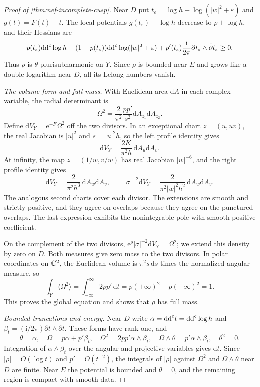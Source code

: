 \begin{proof}[Proof of \cref{thm:nef-incomplete-cusp}]
Near $D$ put $t_\varepsilon=\log h-\log(|w|^2+\varepsilon)$ and $g(t)=F(t)-t$. The local potentials $g(t_\varepsilon)+\log h$ decrease to $\rho+\log h$, and their Hessians are
\[
 p(t_\varepsilon)\mathrm{dd}^{\mathrm{c}}\log h
 +(1-p(t_\varepsilon))\mathrm{dd}^{\mathrm{c}}\log(|w|^2+\varepsilon)
 +p'(t_\varepsilon)\frac{\mathrm{i}}{2\pi}
       \partial t_\varepsilon\wedge\bar\partial t_\varepsilon\geq0.
\]
Thus $\rho$ is $\theta$-plurisubharmonic on $Y$. Since $\rho$ is bounded near $E$ and grows like a double logarithm near $D$, all its Lelong numbers vanish.

\emph{The volume form and full mass.}
With Euclidean area $\mathrm{d}A$ in each complex variable, the radial determinant is
\begin{equation}\label{eq:nef-cusp-radial-determinant}
 \Omega^2=\frac{2}{\pi^2}\frac{pp'}{s^2}
                  \mathrm{d}A_{z_1}\mathrm{d}A_{z_2}.
\end{equation}
Define $\mathrm{d}V_Y=\mathrm{e}^{-F}\Omega^2$ off the two divisors. In an exceptional chart $z=(u,uv)$, the real Jacobian is $|u|^2$ and $s=|u|^2h$, so the left profile identity gives
\[
 \mathrm{d}V_Y=\frac{2K}{\pi^2h}\,\mathrm{d}A_u\mathrm{d}A_v.
\]
At infinity, the map $z=(1/w,v/w)$ has real Jacobian $|w|^{-6}$, and the right profile identity gives
\[
 \mathrm{d}V_Y=\frac{2}{\pi^2h^3}\,\mathrm{d}A_w\mathrm{d}A_v,
 \qquad
 |\sigma|^{-2}\mathrm{d}V_Y
 =\frac{2}{\pi^2|w|^2h^2}\,\mathrm{d}A_w\mathrm{d}A_v.
\]
The analogous second charts cover each divisor. The extensions are smooth and strictly positive, and they agree on overlaps because they agree on the punctured overlaps. The last expression exhibits the nonintegrable pole with smooth positive coefficient.

On the complement of the two divisors, $\mathrm{e}^{\rho}|\sigma|^{-2}\mathrm{d}V_Y=\Omega^2$; we extend this density by zero on $D$. Both measures give zero mass to the two divisors. In polar coordinates on $\mathbb C^2$, the Euclidean volume is $\pi^2s\,\mathrm{d}s$ times the normalized angular measure, so
\[
 \int_Y\langle\Omega^2\rangle
 =\int_{-\infty}^{\infty}2pp'\,\mathrm{d}t
 =p(+\infty)^2-p(-\infty)^2=1.
\]
This proves the global equation and shows that $\rho$ has full mass.

\emph{Bounded truncations and energy.}
Near $D$ write $\alpha=\mathrm{dd}^{\mathrm{c}} t=\mathrm{dd}^{\mathrm{c}}\log h$ and $\beta_t=(\mathrm{i}/2\pi)\partial t\wedge\bar\partial t$. These forms have rank one, and
\[
 \theta=\alpha,\quad \Omega=p\alpha+p'\beta_t,\quad
 \Omega^2=2pp'\alpha\wedge\beta_t,\quad
 \Omega\wedge\theta=p'\alpha\wedge\beta_t,\quad \theta^2=0.
\]
Integration of $\alpha\wedge\beta_t$ over the angular and projective variables gives $\mathrm{d}t$. Since $|\rho|=O(\log t)$ and $p'=O(t^{-2})$, the integrals of $|\rho|$ against $\Omega^2$ and $\Omega\wedge\theta$ near $D$ are finite. Near $E$ the potential is bounded and $\theta=0$, and the remaining region is compact with smooth data.


\end{proof}
